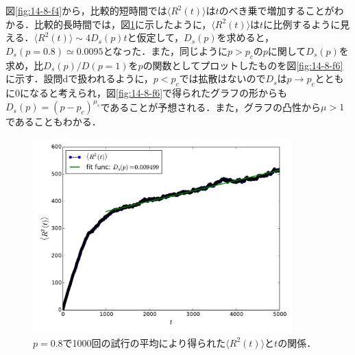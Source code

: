 \documentclass{jsarticle}
\begin{document}
\begin{enumerate}
\begin{enumerate}
                図\ref{fig:14-8-f4}から，比較的短時間では$\langle R^{2}(t) \rangle$は$t$のべき乗で増加することがわかる．比較的長時間では，図\ref{fig:14-8-f5}に示したように，$\langle R^{2}(t) \rangle$は$t$に比例するように見える．$\langle R^{2}(t) \rangle \sim 4D_{s}(p)t$と仮定して，$D_{s}(p)$を求めると，
                $D_{s}(p=0.8)\simeq 0.0095$となった．また，同じように$p>p_{c}$の$p$に関して$D_{s}(p)$を求め，比$D_{s}(p)/D(p=1)$を$p$の関数としてプロットしたものを図\ref{fig:14-8-f6}に示す．設問dで扱われるように，$p<p_c$では拡散はないので$D_{s}$は$p\rightarrow p_{c}$とともに0になると考えられ，図\ref{fig:14-8-f6}で得られたグラフの形からも$D_{s}(p) = (p-p_{c})^{\mu_{s}}$であることが予想される．また，グラフの凸性から$\mu>1$であることもわかる．
                
                \begin{figure}[H]
                    \begin{center}
                        \includegraphics[width=10.0cm]{figure_6.pdf}
                        \caption{$p=0.8$で1000回の試行の平均により得られた$\langle R^{2}(t) \rangle$と$t$の関係．}
                        \label{fig:14-8-f5}
                    \end{center}
                \end{figure}
                

\end{enumerate}
\end{enumerate}
\end{document}
